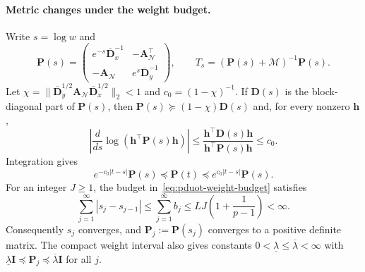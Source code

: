 \paragraph{Metric changes under the weight budget.}
Write $s=\log w$ and
\begin{equation*}
\mathbf P(s)=\begin{pmatrix}e^{-s}\overline{\mathbf D}_x^{-1}&-\mathbf A_{\mathcal N}^{\top}\\-\mathbf A_{\mathcal N}&e^s\overline{\mathbf D}_y^{-1}\end{pmatrix},\qquad T_s=(\mathbf P(s)+\mathcal M)^{-1}\mathbf P(s).
\end{equation*}
Let $\chi=\|\overline{\mathbf D}_y^{1/2}\mathbf A_{\mathcal N}\overline{\mathbf D}_x^{1/2}\|_2<1$ and $c_0=(1-\chi)^{-1}$.
If $\mathbf D(s)$ is the block-diagonal part of $\mathbf P(s)$, then $\mathbf P(s)\succeq(1-\chi)\mathbf D(s)$ and, for every nonzero $\mathbf h$,
\begin{equation*}
\left|\frac{d}{ds}\log(\mathbf h^\top\mathbf P(s)\mathbf h)\right|\leq\frac{\mathbf h^\top\mathbf D(s)\mathbf h}{\mathbf h^\top\mathbf P(s)\mathbf h}\leq c_0.
\end{equation*}
Integration gives
\begin{equation}
\label{eq:pduot-metric-comparison}
e^{-c_0|t-s|}\mathbf P(s)\preceq\mathbf P(t)\preceq e^{c_0|t-s|}\mathbf P(s).
\end{equation}
For an integer $J\geq1$, the budget in~\eqref{eq:pduot-weight-budget} satisfies
\begin{equation*}
\sum_{j=1}^{\infty}|s_j-s_{j-1}|\leq\sum_{j=1}^{\infty}b_j\leq LJ\left(1+\frac{1}{p-1}\right)<\infty.
\end{equation*}
Consequently $s_j$ converges, and $\mathbf P_j:=\mathbf P(s_j)$ converges to a positive definite matrix.
The compact weight interval also gives constants $0<\underline\lambda\leq\overline\lambda<\infty$ with $\underline\lambda\mathbf I\preceq\mathbf P_j\preceq\overline\lambda\mathbf I$ for all $j$.

